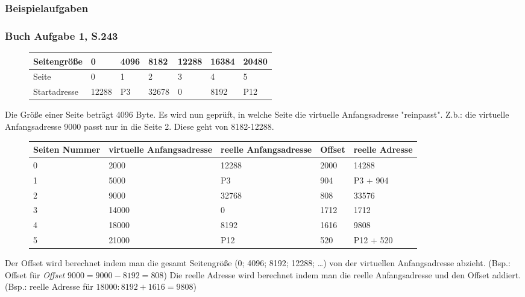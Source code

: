 \documentclass[12pt,a4paper]{article}
\begin{document}
\subsubsection{Beispielaufgaben}

\subsubsection{Buch Aufgabe 1, S.243}
	\begin{figure} [h]
		\begin{tabularx}{17cm}{| l | X | X | X | X | X | X | }
			\hline
			\small{Seitengröße} & 0 & 4096 & 8182 & 12288 & 16384 & 20480 \\
			\hline
			\small{Seite} & 0&1&2&3&4&5\\
			\hline
			\small{Startadresse} & 12288 & P3 & 32678 & 0 & 8192 & P12 \\
			\hline
		\end{tabularx}
	\end{figure}
\noindent Die Größe einer Seite beträgt 4096 Byte. Es wird nun geprüft, in welche Seite die virtuelle Anfangsadresse "reinpasst". Z.b.: die virtuelle Anfangsadresse 9000 passt nur in die Seite 2. Diese geht von 8182-12288.
\begin{figure}[h]
	\begin{tabularx}{17cm}{| X | X | X | X | X |}
		\hline 
		\small{Seiten Nummer} & \small{virtuelle Anfangsadresse} & \small{reelle Anfangsadresse} & \small{Offset} & 			\small{reelle Adresse} \\
		\hline
		0 & 2000 & 12288 & 2000 & 14288 \\
		\hline
		1 & 5000 & P3 & 904 & P3 + 904 \\
		\hline
		2 & 9000 & 32768 & 808 & 33576 \\
		\hline
		3 & 14000 & 0 & 1712 & 1712 \\
		\hline
		4 & 18000 & 8192 & 1616 & 9808 \\
		\hline
		5 & 21000 & P12 & 520 & P12 + 520 \\
		\hline
	\end{tabularx}
\end{figure}
\noindent Der Offset wird berechnet indem man die gesamt Seitengröße (0; 4096; 8192; 12288; \dots) von der virtuellen Anfangsadresse abzieht. (Bsp.: Offset für \textit{Offset} $9000=9000-8192 = 808$)\newline
Die reelle Adresse wird berechnet indem man die reelle Anfangsadresse und den Offset \newline addiert. (Bsp.: reelle Adresse für $18000: 8192+1616=9808$)
\end{document}
